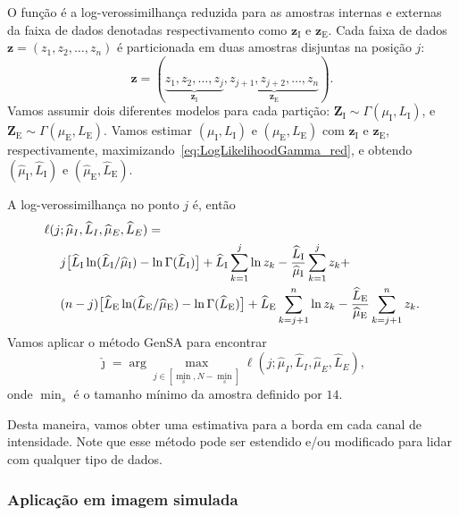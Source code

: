 O função é a log-verossimilhança reduzida para as amostras internas e externas da faixa de dados denotadas respectivamento como $\bm z_\text{I}$ e $\bm z_\text{E}$. Cada faixa de dados $\bm z = (z_1,z_2,\dots,z_n)$ é particionada em duas amostras disjuntas na posição $j$:  
$$
\bm z = (\underbrace{z_1,z_2,\dots,z_j}_{\bm z_\text{I}}, 
\underbrace{z_{j+1}, z_{j+2},\dots,z_n}_{\bm z_\text{E}}).
$$
Vamos assumir dois diferentes modelos para cada partição:
$\bm Z_\text{I} \sim \Gamma(\mu_\text{I},L_\text{I})$, e
$\bm Z_\text{E} \sim \Gamma(\mu_\text{E},L_\text{E})$.
Vamos estimar $(\mu_\text{I},L_\text{I})$ e $(\mu_\text{E},L_\text{E})$ com $\bm z_\text{I}$ e $\bm z_\text{E}$, respectivamente, maximizando~\eqref{eq:LogLikelihoodGamma_red}, e obtendo $(\widehat{\mu}_\text{I}, \widehat{L}_\text{I})$ e $(\widehat{\mu}_\text{E}, \widehat{L}_\text{E})$.


A log-verossimilhança no ponto $j$ é, então
\begin{equation}\label{eq:TotalLogLikelihood}
\begin{split}
\ell(j&;\widehat{\mu}_I, \widehat{L}_I,\widehat{\mu}_E, \widehat{L}_E)=\\
&j \big[\widehat{L}_\text{I}\ln (\widehat{L}_\text{I} / \widehat{\mu}_\text{I}) - \ln \Gamma(\widehat{L}_\text{I})\big]
+\widehat{L}_\text{I} \sum_{k=1}^{j}\ln z_k -\frac{\widehat{L}_\text{I}}{\widehat{\mu}_\text{I}}\sum_{k=1}^{j} z_k +\\
&(n-j) \big[\widehat{L}_\text{E}\ln (\widehat{L}_\text{E} / \widehat{\mu}_\text{E}) - \ln \Gamma(\widehat{L}_\text{E})\big]
+\widehat{L}_\text{E} \sum_{k=j+1}^{n}\ln z_k - \frac{\widehat{L}_\text{E}}{\widehat{\mu}_\text{E}}\sum_{k=j+1}^{n} z_k.
\raisetag{2.2em}
\end{split}
\end{equation}
Vamos aplicar o método GenSA para encontrar
$$
\widehat{\jmath}= \arg\max\limits_{j\in [\min_s,N-\min_s]}\ell(j;\widehat{\mu}_I, \widehat{L}_I,\widehat{\mu}_E, \widehat{L}_E),
$$ 
onde $\min_s$ é o tamanho mínimo da amostra definido por $14$.

Desta maneira, vamos obter uma estimativa para a borda em cada canal de intensidade.
Note que esse método pode ser estendido e/ou modificado para lidar com qualquer tipo de dados.



\subsubsection*{Aplicação em imagem simulada}

